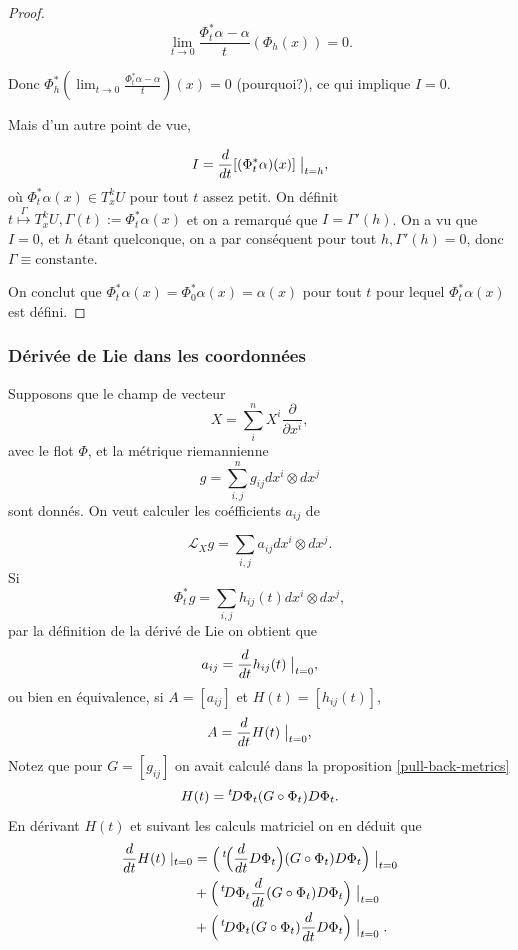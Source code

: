 \documentclass[french]{article}
\theoremstyle{definition}
\begin{document}
\begin{proof}
  \[\lim_{t \to 0} \frac{\Phi_t ^{*} \alpha - \alpha}{t}(\Phi_h (x))=0.\]

  Donc \(\Phi_h ^{*}\left(\displaystyle  \lim_{t \to 0} \frac{\Phi_t ^{*}\alpha- \alpha}{t} \right)(x)= 0\) (pourquoi?), ce qui implique \(I=0\).


Mais d'un autre point de vue,

\[I = \frac{d}{dt}[(\Phi_t ^{*}\alpha)(x)]\bigm|_{t=h},\] où \(\Phi^*_t \alpha(x) \in T_x ^{k} U\) pour tout \(t\) assez petit. On définit \(t \stackrel{\Gamma}{\longmapsto}T_x ^{k}U, \Gamma(t):=\Phi_t ^{*} \alpha(x)\) et on a remarqué que \(I = \Gamma'(h)\). On a vu que \(I=0\), et \(h\) étant quelconque, on a par conséquent pour tout \(h, \Gamma'(h)=0\), donc \(\Gamma \equiv \text{constante}.\)

On conclut que \(\Phi_t^{*}\alpha(x) = \Phi_0^{*}\alpha(x) = \alpha(x)\) pour tout \(t\) pour lequel \(\Phi_t^{*}\alpha(x) \) est défini.
\end{proof}



\subsubsection{D\'eriv\'ee de Lie dans les coordonn\'ees}

Supposons que le champ de vecteur
\[
X= \sum_i^n X^i \frac{\partial}{\partial x^i},
\] avec le flot $\Phi$, et la m\'etrique riemannienne
\[
g= \sum_{i,j}^n g_{ij} dx^i \otimes dx^j
\] sont donn\'es. On veut calculer les co\'efficients $a_{ij}$ de

\[
\mathcal{L}_X g = \sum_{i,j} a _{ij}d x^{i}\otimes d x^{j}.
\] Si
\[
\Phi_t^*g =  \sum_{i,j} h_{ij}(t)d x^{i}\otimes d x^{j},
\] par la d\'efinition de la d\'eriv\'e de Lie on obtient que
\[
a_{ij} = \frac{d}{dt}h_{ij}(t)\bigm|_{t=0},
\] ou bien en \'equivalence, si $A=[a_{ij}]$ et $H(t)= [h_{ij}(t)]$,
\[
A=  \frac{d}{dt}H(t)\bigm|_{t=0},
\]
Notez que pour $G=[g_{ij}]$  on avait calcul\'e dans la proposition  \ref{pull-back-metrics}
\[
H(t)= \prescript{t}{}\!D\Phi_t (G \circ \Phi_t) D\Phi_t.
\]  En d\'erivant $H(t)$ et  suivant les calculs matriciel on en d\'eduit que
\[
\begin{aligned}
\frac{d}{dt}H(t) \mid_{t=0}
& =  \Big (\prescript{t}{}\!\Big (\frac{d}{dt}D\Phi_t \Big ) (G \circ \Phi_t) D\Phi_t \Big)  \bigm|_{t=0}
\\ & + \Big( \prescript{t}{}\!D\Phi_t \frac{d}{dt}(G \circ \Phi_t)   D\Phi_t \Big)  \bigm|_{t=0}
\\ & + \Big (\prescript{t}{}\!D\Phi_t (G \circ \Phi_t) \frac{d}{dt}  D\Phi_t\Big )  \bigm|_{t=0}.
\end{aligned}
\]
\end{document}
